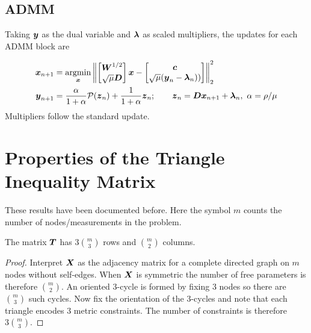 \documentclass{article}
\begin{document}
\subsection*{ADMM}

Taking $\boldsymbol{y}$ as the dual variable and $\boldsymbol{\lambda}$ as scaled multipliers, the updates for each ADMM block are

\begin{align*}
  \boldsymbol{x}_{n+1}
  &= \underset{\boldsymbol{x}}{\mathop{\rm argmin}\nolimits} \left\|
    \begin{bmatrix}
      \boldsymbol{W}^{1/2} \\
      \sqrt{\mu} \boldsymbol{D}
    \end{bmatrix} \boldsymbol{x}
    -
    \begin{bmatrix}
      \boldsymbol{c} \\
      \sqrt{\mu} (\boldsymbol{y}_{n} - \boldsymbol{\lambda}_{n}))
    \end{bmatrix}
  \right\|_{2}^{2} \\
  \boldsymbol{y}_{n+1}
  &= \frac{\alpha}{1+\alpha} \mathcal{P}(\boldsymbol{z}_{n}) + \frac{1}{1+\alpha} \boldsymbol{z}_{n};
  \qquad \boldsymbol{z}_{n} = \boldsymbol{D} \boldsymbol{x}_{n+1} + \boldsymbol{\lambda}_{n},~\alpha = \rho / \mu
\end{align*}
Multipliers follow the standard update.

\section*{\center Properties of the Triangle Inequality Matrix}

These results have been documented before.
Here the symbol $m$ counts the number of nodes/measurements in the problem.

\begin{proposition}
    The matrix \(\boldsymbol{T}\) has \(3 \binom{m}{3}\) rows and \(\binom{m}{2}\) columns.
\end{proposition}
\begin{proof}
    Interpret \(\boldsymbol{X}\) as the adjacency matrix for a complete directed graph on \(m\) nodes without self-edges.
    When \(\boldsymbol{X}\) is symmetric the number of free parameters is therefore \(\binom{m}{2}\).
    An oriented \(3\)-cycle is formed by fixing \(3\) nodes so there are \(\binom{m}{3}\) such cycles.
    Now fix the orientation of the \(3\)-cycles and note that each triangle encodes \(3\) metric constraints.
    The number of constraints is therefore \(3 \binom{m}{3}\).
\end{proof}
\end{document}
